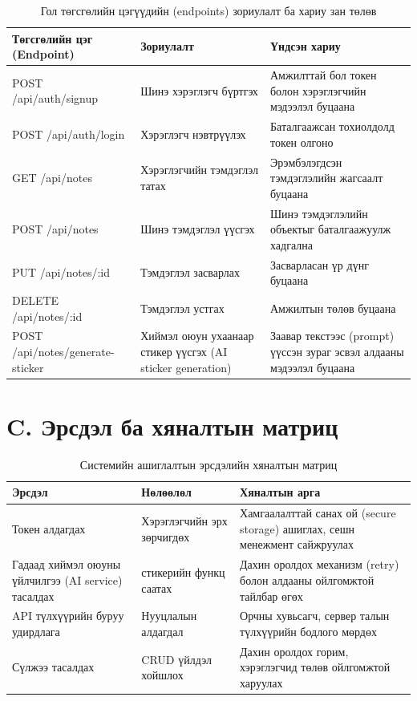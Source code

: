 \begin{table}[H]
\centering
\caption{Гол төгсгөлийн цэгүүдийн (endpoints) зориулалт ба хариу зан төлөв}
\label{tab:appendix_api_summary}
\small
\begin{tabular}{>{\raggedright\arraybackslash}p{3.8cm}>{\raggedright\arraybackslash}p{4.2cm}>{\raggedright\arraybackslash}p{4.6cm}}
\toprule
\textbf{Төгсгөлийн цэг (Endpoint)} & \textbf{Зориулалт} & \textbf{Үндсэн хариу} \\
\midrule
POST /api/auth/signup & Шинэ хэрэглэгч бүртгэх & Амжилттай бол токен болон хэрэглэгчийн мэдээлэл буцаана \\
POST /api/auth/login & Хэрэглэгч нэвтрүүлэх & Баталгаажсан тохиолдолд токен олгоно \\
GET /api/notes & Хэрэглэгчийн тэмдэглэл татах & Эрэмбэлэгдсэн тэмдэглэлийн жагсаалт буцаана \\
POST /api/notes & Шинэ тэмдэглэл үүсгэх & Шинэ тэмдэглэлийн объектыг баталгаажуулж хадгална \\
PUT /api/notes/:id & Тэмдэглэл засварлах & Засварласан үр дүнг буцаана \\
DELETE /api/notes/:id & Тэмдэглэл устгах & Амжилтын төлөв буцаана \\
POST /api/notes/generate-sticker & Хиймэл оюун ухаанаар стикер үүсгэх (AI sticker generation) & Заавар текстээс (prompt) үүссэн зураг эсвэл алдааны мэдээлэл буцаана \\
\bottomrule
\end{tabular}
\end{table}

\section*{C. Эрсдэл ба хяналтын матриц}

\begin{table}[H]
\centering
\caption{Системийн ашиглалтын эрсдэлийн хяналтын матриц}
\label{tab:appendix_risk_matrix}
\small
\begin{tabular}{>{\raggedright\arraybackslash}p{3.8cm}>{\raggedright\arraybackslash}p{4.0cm}>{\raggedright\arraybackslash}p{4.8cm}}
\toprule
\textbf{Эрсдэл} & \textbf{Нөлөөлөл} & \textbf{Хяналтын арга} \\
\midrule
Токен алдагдах & Хэрэглэгчийн эрх зөрчигдөх & Хамгаалалттай санах ой (secure storage) ашиглах, сешн менежмент сайжруулах \\
Гадаад хиймэл оюуны үйлчилгээ (AI service) тасалдах & стикерийн функц саатах & Дахин оролдох механизм (retry) болон алдааны ойлгомжтой тайлбар өгөх \\
API түлхүүрийн буруу удирдлага & Нууцлалын алдагдал & Орчны хувьсагч, сервер талын түлхүүрийн бодлого мөрдөх \\
Сүлжээ тасалдах & CRUD үйлдэл хойшлох & Дахин оролдох горим, хэрэглэгчид төлөв ойлгомжтой харуулах \\
\bottomrule
\end{tabular}
\end{table}

